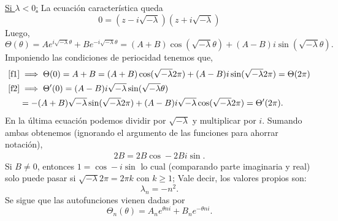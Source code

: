\begin{Solucion}
\begin{enumerate}[label=(\alph*), topsep=3pt, itemsep=2pt]
	\underline{Si \(\lambda < 0\):} La ecuación característica queda
	\begin{displaymath}
		0 = (z - i\sqrt{-\lambda}) (z + i\sqrt{-\lambda})
	\end{displaymath}
	Luego, 
	\begin{displaymath}
		\Theta(\theta) 
		=
		A e^{i\sqrt{-\lambda} \theta} 
		+
		B e^{-i\sqrt{-\lambda} \theta}
		=
		(A+B) \cos(\sqrt{-\lambda} \theta) 
		+
		(A-B) i \sin(\sqrt{-\lambda} \theta).
	\end{displaymath}
	Imponiendo las condiciones de periocidad tenemos que,
	\begin{alignat*}{3}
		\eqref{f1} &\implies
		\Theta(0) 
		= A + B 
		= 
		(A+B) \cos(\sqrt{-\lambda} 2\pi) 
		+ (A-B) i \sin(\sqrt{-\lambda} 2\pi)
		=
		\Theta(2\pi)
		\\
		\eqref{f2} &\implies
		\Theta'(0) 
		= (A-B) i \sqrt{-\lambda} \sin(\sqrt{-\lambda} \theta)
		\\&= 
		-(A+B) \sqrt{-\lambda} \sin(\sqrt{-\lambda} 2\pi) 
		+ (A-B) i \sqrt{-\lambda} \cos(\sqrt{-\lambda} 2\pi)
		=
		\Theta'(2\pi).
	\end{alignat*}
	En la última ecuación podemos dividir por \(\sqrt{-\lambda}\) y
	multiplicar por \(i\). Sumando ambas obtenemos (ignorando el
	argumento de las funciones para ahorrar notación),
	\begin{align*}
		2B = 2B \cos - 2B i\sin.
	\end{align*}
	Si \(B \ne 0\), entonces \(1 = \cos - i \sin\) lo cual (comparando
	parte imaginaria y real) solo puede pasar si \(\sqrt{-\lambda}
	2\pi = 2\pi k\) con \(k \ge 1\); Vale decir, los valores propios
	son:
	\begin{displaymath}
		\lambda_{n} = -n^2.
	\end{displaymath}
	Se sigue que las autofunciones vienen dadas por
	\begin{displaymath}
		\Theta_{n}(\theta) = A_n e^{\theta n i} + B_n e^{-\theta n i}.
	\end{displaymath}


\end{enumerate}
\end{Solucion}
